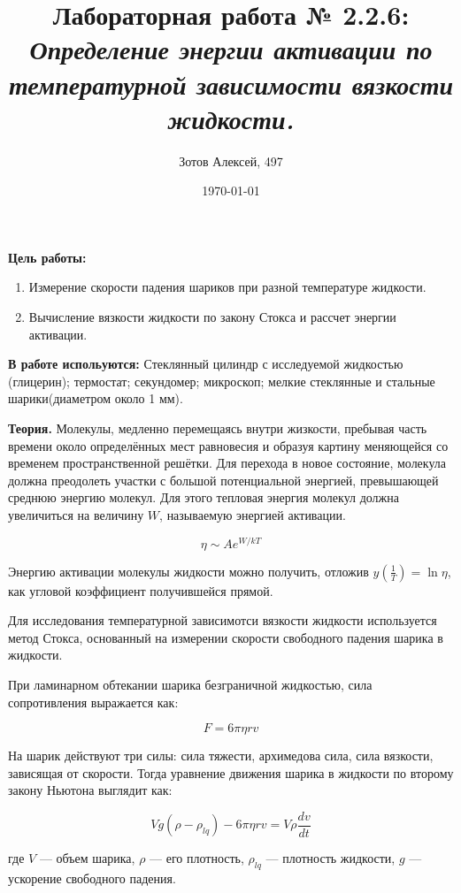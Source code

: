 \documentclass[10pt]{article}
\title{Лабораторная работа № 2.2.6: {\it Определение энергии активации по температурной зависимости вязкости жидкости.}}
\author{Зотов Алексей, 497}
\date{\today}
\begin{document}
\maketitle
\textbf{Цель работы:}
    \begin{enumerate}
    \item Измерение скорости падения шариков при разной температуре жидкости.
    \item Вычисление вязкости жидкости по закону Стокса и рассчет энергии активации.
    \end{enumerate}

\textbf{В работе испольуются:} Стеклянный цилиндр с исследуемой жидкостью (глицерин); термостат; секундомер; микроскоп; мелкие стеклянные и стальные шарики(диаметром около 1 мм).

\textbf{Теория.}
Молекулы, медленно перемещаясь внутри жизкости, пребывая часть времени около определённых мест равновесия и образуя картину меняющейся со временем пространственной решётки. Для перехода в новое состояние, молекула должна преодолеть участки с большой потенциальной 
энергией, превышающей среднюю энергию молекул. Для этого тепловая энергия молекул должна увеличиться на величину $W$, называемую энергией активации.


\begin{equation}
    \eta \sim A e^{W/kT}
\end{equation}

Энергию активации молекулы жидкости можно получить, отложив $y(\frac{1}{T}) = \ln \eta $, как угловой коэффициент получившейся прямой.

Для исследования температурной зависимотси вязкости жидкости используется метод Стокса, основанный на измерении скорости свободного падения шарика в жидкости.

При ламинарном обтекании шарика безграничной жидкостью, сила сопротивления выражается как:

\begin{equation}
    F = 6 \pi \eta r v
\end{equation}

На шарик действуют три силы: сила тяжести, архимедова сила, сила вязкости, зависящая от скорости. Тогда уравнение движения шарика в жидкости по второму закону Ньютона выглядит как:

\begin{equation}
    V g (\rho - \rho_{lq} ) - 6 \pi \eta r v = V \rho \frac{dv}{dt}
\end{equation}

где $V$ — объем шарика, $\rho$ — его плотность, $\rho_{lq}$ — плотность жидкости, $g$ — ускорение свободного падения.
\end{document}
